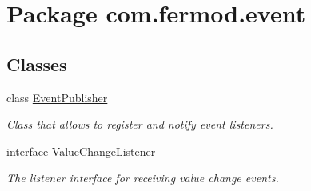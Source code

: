 \hypertarget{a00014}{}\section{Package com.\+fermod.\+event}
\label{a00014}
\subsection*{Classes}
\begin{DoxyCompactItemize}
\item 
class \mbox{\hyperlink{a00022}{Event\+Publisher}}
\begin{DoxyCompactList}\small\item\em Class that allows to register and notify event listeners. \end{DoxyCompactList}\item 
interface \mbox{\hyperlink{a00026}{Value\+Change\+Listener}}
\begin{DoxyCompactList}\small\item\em The listener interface for receiving value change events. \end{DoxyCompactList}\end{DoxyCompactItemize}
